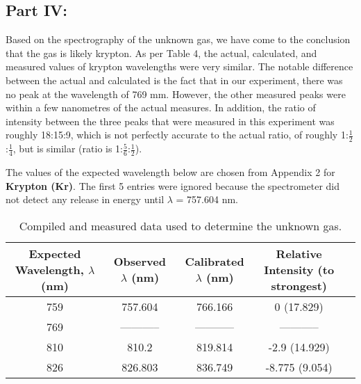 \documentclass[10pt, letterpaper, twoside]{article}
\begin{document}
\subsection{Part IV:}
\vspace{-1em}
Based on the spectrography of the unknown gas, we have come to the conclusion that the gas is likely krypton. As per Table 4, the actual, calculated, and measured values of krypton wavelengths were very similar. The notable difference between the actual and calculated is the fact that in our experiment, there was no peak at the wavelength of 769 mm. However, the other measured peaks were within a few nanometres of the actual measures. In addition, the ratio of intensity between the three peaks that were measured in this experiment was roughly 18:15:9, which is not perfectly accurate to the actual ratio, of roughly 1:$\frac{1}{2}$:$\frac{1}{4}$, but is similar (ratio is 1:$\frac{5}{6}$:$\frac{1}{2}$). 

The values of the expected wavelength below are chosen from Appendix 2 for \textbf{Krypton (Kr)}. The first 5 entries were ignored because the spectrometer did not detect any release in energy until $\lambda$ = 757.604 nm.


\begin{table}[!ht]
    \centering
    \begin{tabular}{|c|c|c|c|c|}
        \hline
        Expected Wavelength, $\lambda$ (nm) & Observed $\lambda$ (nm) & Calibrated $\lambda$ (nm) & Relative Intensity (to strongest) \\
        \hline
          759 & 757.604 & 766.166 & 0 (17.829)\\
        \hline
          769 & ----------- & ----------- & ----------- \\
        \hline
          810 & 810.2 & 819.814 & -2.9 (14.929)\\
         \hline
          826 & 826.803 & 836.749 & -8.775 (9.054)\\
        \hline
    \end{tabular}
    \caption{Compiled and measured data used to determine the unknown gas.}
    \label{tab:my_label}
\end{table}
\end{document}
